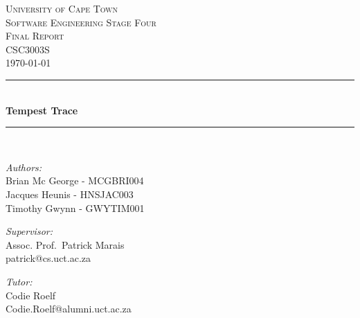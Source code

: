 \documentclass[11pt,a4paper]{article}
\begin{document}
    \begin{titlepage} \begin{center}
            \textsc{\LARGE University of Cape Town}
            \\[1.5cm] \textsc{\Large Software Engineering Stage Four} \\\smallskip
            \textsc{\Large Final Report} \\\smallskip
            \textsc{\Large CSC3003S} \\\smallskip
            \textsc{\Large \today} \\\smallskip
            \noindent\rule[0.4mm]{\textwidth}{0.1mm}
            \\[0.4cm] { \huge \bfseries Tempest Trace \\[0.4cm] }
            \noindent\rule[0.4mm]{\textwidth}{0.1mm}
            \\[1cm]
            \begin{minipage}[t]{0.4\textwidth}
                \begin{flushleft}\large \emph{Authors:}\\ Brian Mc George - MCGBRI004 \\ Jacques Heunis - HNSJAC003 \\ Timothy Gwynn - GWYTIM001
                    \\[2cm]
                \end{flushleft}
            \end{minipage} \begin{minipage}[t]{0.4\textwidth}
            \begin{flushright} \large \emph{Supervisor:} \\ Assoc. Prof.~Patrick Marais\\patrick@cs.uct.ac.za\end{flushright}
            \begin{flushright} \large \emph{Tutor:} \\ Codie Roelf\\Codie.Roelf@alumni.uct.ac.za\end{flushright}
        \end{minipage}
    \end{center}
\end{titlepage}
\newpage
\tableofcontents
\newpage

\chead{}
\rhead{\today}   %
\lfoot{}
\cfoot{\thepage}    %
\rfoot{}
\renewcommand{\headrulewidth}{0.0pt}   %
\end{document}
